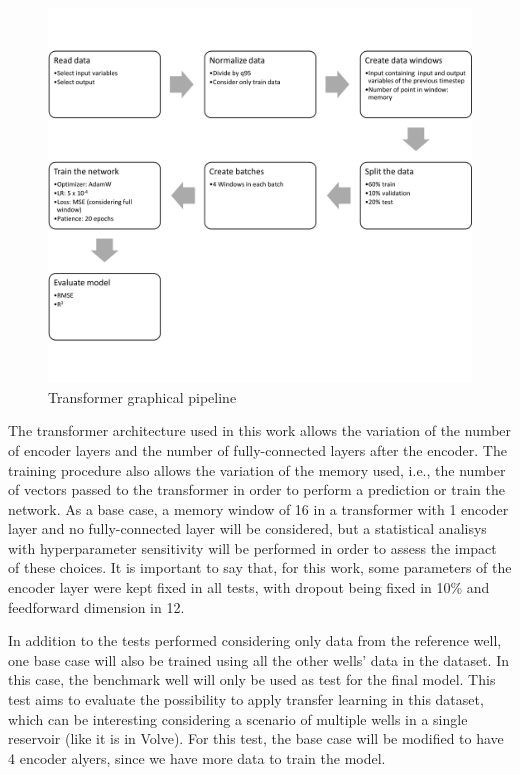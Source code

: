 \documentclass[conference]{IEEEtran}
\begin{document}
\begin{figure}[htbp]
    \centerline{\includegraphics[width=6in]{images/graphical_abstract_transformers.png}}
    \caption{Transformer graphical pipeline}
    \label{fig:graphical_abstract_transfomers}
\end{figure}

The transformer architecture used in this work allows the variation of the number of
encoder layers and the number of fully-connected layers after the encoder. The training procedure
also allows the variation of the memory used, i.e., the number of vectors passed to the
transformer in order to perform a prediction or train the network. As a base case, a memory window of 16
in a transformer with 1 encoder layer and no fully-connected layer will be considered, but a statistical
analisys with hyperparameter sensitivity will be performed in order to assess the impact of these
choices. It is important to say that, for this work, some parameters of the encoder layer were kept fixed
in all tests, with dropout being fixed in 10\% and feedforward dimension in 12.

In addition to the tests performed considering only data from the reference well, one base case
will also be trained using all the other wells' data in the dataset. In this case, the benchmark
well will only be used as test for the final model. This test aims to evaluate the possibility to apply
transfer learning in this dataset, which can be interesting considering a scenario of
multiple wells in a single reservoir (like it is in Volve). For this test, the base case will
be modified to have 4 encoder alyers, since we have more data to train the model.
\end{document}

